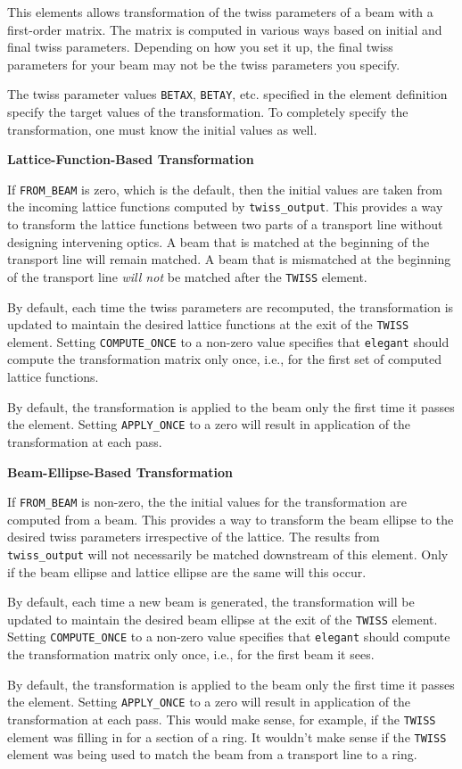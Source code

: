 This elements allows transformation of the twiss parameters of 
a beam with a first-order matrix.  The matrix is computed in 
various ways based on initial and final twiss parameters.  Depending on 
how you set it up, the final twiss parameters for your
beam may not be the twiss parameters you specify.  

The twiss parameter values \verb|BETAX|, \verb|BETAY|, etc. specified in the
element definition specify the target values of the transformation.
To completely specify the transformation, one must know the initial
values as well.  

{\bf Lattice-Function-Based Transformation}

If \verb|FROM_BEAM| is zero, which is the default, then the initial
values are taken from the incoming lattice functions computed by
\verb|twiss_output|.  This provides a way to transform the lattice
functions between two parts of a transport line without designing
intervening optics.  A beam that is matched at the beginning of the
transport line will remain matched.  A beam that is mismatched at the
beginning of the transport line {\em will not} be matched after
the \verb|TWISS| element.

By default, each time the twiss parameters are recomputed, the
transformation is updated to maintain the desired lattice functions at
the exit of the \verb|TWISS| element. Setting \verb|COMPUTE_ONCE| to a
non-zero value specifies that {\tt elegant} should compute the
transformation matrix only once, i.e., for the first set of computed
lattice functions.

By default, the transformation is applied to the beam only the first
time it passes the element.  Setting \verb|APPLY_ONCE| to a zero
will result in application of the transformation at each pass.

{\bf Beam-Ellipse-Based Transformation}

If \verb|FROM_BEAM| is non-zero, the the initial values for the transformation
are computed from a beam.  This provides a way to transform the beam ellipse
to the desired twiss parameters irrespective of the lattice.  The results
from \verb|twiss_output| will not necessarily be matched downstream of this
element.  Only if the beam ellipse and lattice ellipse are the same will this
occur.

By default, each time a new beam is generated, the transformation will
be updated to maintain the desired beam ellipse at the exit of the
\verb|TWISS| element.  Setting \verb|COMPUTE_ONCE| to a non-zero value
specifies that {\tt elegant} should compute the transformation matrix
only once, i.e., for the first beam it sees.

By default, the transformation is applied to the beam only the first
time it passes the element.  Setting \verb|APPLY_ONCE| to a zero
will result in application of the transformation at each pass.  This
would make sense, for example, if the \verb|TWISS| element was
filling in for a section of a ring.  It wouldn't make sense if
the \verb|TWISS| element was being used to match the beam from
a transport line to a ring.

